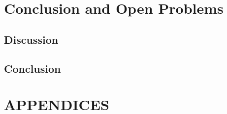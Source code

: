 \documentclass[letterpaper,12pt,titlepage,oneside,final]{book}
\theoremstyle{plain}
\let\origdoublepage\cleardoublepage
\newcommand{\clearemptydoublepage}{%
  \clearpage{\pagestyle{empty}\origdoublepage}}
\let\cleardoublepage\clearemptydoublepage
\begin{document}



\chapter{Conclusion and Open Problems} \label{Conclusion and Open Problems}

\section{Discussion}

\section{Conclusion}



\appendix

\chapter*{APPENDICES}





\cleardoublepage %
\renewcommand*{\bibname}{References}




\nocite{*}
\end{document}
